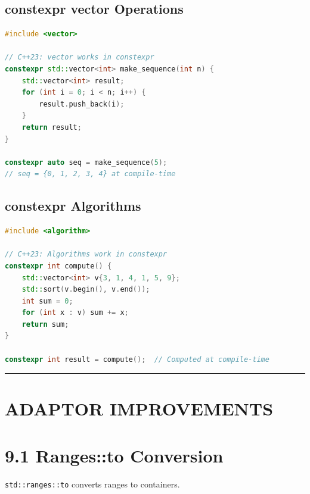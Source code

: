 \hypertarget{constexpr-vector-operations}{%
\subsection{constexpr vector
Operations}\label{constexpr-vector-operations}}

\begin{lstlisting}[language={C++}]
#include <vector>

// C++23: vector works in constexpr
constexpr std::vector<int> make_sequence(int n) {
    std::vector<int> result;
    for (int i = 0; i < n; i++) {
        result.push_back(i);
    }
    return result;
}

constexpr auto seq = make_sequence(5);
// seq = {0, 1, 2, 3, 4} at compile-time
\end{lstlisting}

\hypertarget{constexpr-algorithms}{%
\subsection{constexpr Algorithms}\label{constexpr-algorithms}}

\begin{lstlisting}[language={C++}]
#include <algorithm>

// C++23: Algorithms work in constexpr
constexpr int compute() {
    std::vector<int> v{3, 1, 4, 1, 5, 9};
    std::sort(v.begin(), v.end());
    int sum = 0;
    for (int x : v) sum += x;
    return sum;
}

constexpr int result = compute();  // Computed at compile-time
\end{lstlisting}

\begin{center}\rule{0.5\linewidth}{0.5pt}\end{center}

\hypertarget{adaptor-improvements}{%
\section{ADAPTOR IMPROVEMENTS}\label{adaptor-improvements}}

\hypertarget{rangesto-conversion}{%
\section{9.1 Ranges::to Conversion}\label{rangesto-conversion}}

\passthrough{\lstinline!std::ranges::to!} converts ranges to containers.

